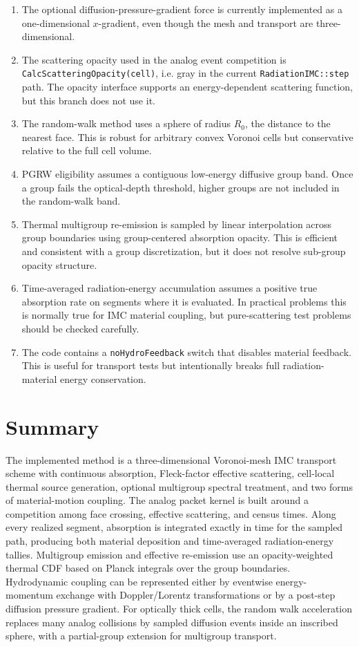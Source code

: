 \documentclass[11pt]{article}
\begin{document}
\begin{enumerate}
\item The optional diffusion-pressure-gradient force is currently implemented
as a one-dimensional \(x\)-gradient, even though the mesh and transport are
three-dimensional.
\item The scattering opacity used in the analog event competition is
\texttt{CalcScatteringOpacity(cell)}, i.e. gray in the current
\texttt{RadiationIMC::step} path. The opacity interface supports an
energy-dependent scattering function, but this branch does not use it.
\item The random-walk method uses a sphere of radius \(R_0\), the distance to
the nearest face. This is robust for arbitrary convex Voronoi cells but
conservative relative to the full cell volume.
\item PGRW eligibility assumes a contiguous low-energy diffusive group band.
Once a group fails the optical-depth threshold, higher groups are not included
in the random-walk band.
\item Thermal multigroup re-emission is sampled by linear interpolation across
group boundaries using group-centered absorption opacity. This is efficient and
consistent with a group discretization, but it does not resolve sub-group
opacity structure.
\item Time-averaged radiation-energy accumulation assumes a positive true
absorption rate on segments where it is evaluated. In practical problems this
is normally true for IMC material coupling, but pure-scattering test problems
should be checked carefully.
\item The code contains a \texttt{noHydroFeedback} switch that disables
material feedback. This is useful for transport tests but intentionally breaks
full radiation-material energy conservation.
\end{enumerate}

\section{Summary}

The implemented method is a three-dimensional Voronoi-mesh IMC transport
scheme with continuous absorption, Fleck-factor effective scattering,
cell-local thermal source generation, optional multigroup spectral treatment,
and two forms of material-motion coupling. The analog packet kernel is built
around a competition among face crossing, effective scattering, and census
times. Along every realized segment, absorption is integrated exactly in time
for the sampled path, producing both material deposition and time-averaged
radiation-energy tallies. Multigroup emission and effective re-emission use an
opacity-weighted thermal CDF based on Planck integrals over the group
boundaries. Hydrodynamic coupling can be represented either by eventwise
energy-momentum exchange with Doppler/Lorentz transformations or by a
post-step diffusion pressure gradient. For optically thick cells, the random
walk acceleration replaces many analog collisions by sampled diffusion events
inside an inscribed sphere, with a partial-group extension for multigroup
transport.
\end{document}
